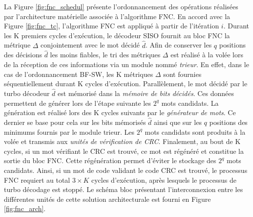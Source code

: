 La Figure \ref{fig:fnc_schedul} présente l'ordonnancement des opérations 
réalisées par l'architecture matérielle associée à l'algorithme FNC.
En accord avec la Figure \ref{fig:fnc_tc}, l'algorithme FNC est appliqué à partir de l'itération $i$. Durant les K 
premiers cycles d'exécution, le 
décodeur SISO fournit au bloc FNC la métrique $\Delta$ conjointement avec le mot décidé $\hat{d}$. 
Afin de conserver les $q$ positions des décisions $\hat{d}$ les moins fiables, le tri des métriques $\Delta$ est réalisé 
à la volée lors de la réception de ces informations via un module nommé \textit{trieur}. En effet, dans le cas de 
l’ordonnancement BF-SW, les K métriques $\Delta$ sont fournies séquentiellement durant K cycles d'exécution. Parallèlement, 
le mot décidé par le turbo décodeur $\hat{d}$ est mémorisé dans la \textit{mémoire de bits décidés}. Ces données permettent de générer lors de 
l'étape suivante les $2^q$ mots candidats. La génération est réalisé lors des K cycles suivants par le 
\textit{générateur de mots}. Ce dernier se base pour cela sur les bits mémorisés $\hat{d}$ ainsi que sur les $q$ positions
des minimums fournis par le module trieur.
Les 
$2^q$ mots candidats sont produits à la volée et transmis aux \textit{unités de vérification de CRC}. Finalement, au 
bout de K cycles, si un mot 
vérifiant le CRC est trouvé, ce mot est régénéré et constitue la sortie du bloc FNC. Cette régénération permet d'éviter 
le stockage des $2^q$ mots candidats. Ainsi, si un mot de code validant le
code CRC est trouvé, le processus FNC requiert au total $3\times K$ cycles d'exécution, après lesquels le processus de 
turbo décodage est stoppé. Le schéma bloc présentant l'interconnexion entre les 
différentes unités de cette solution architecturale est fourni en Figure \ref{fig:fnc_arch}. 

